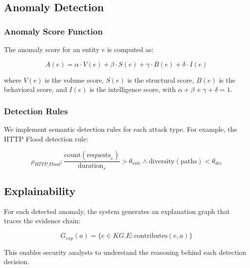 \documentclass[preprint,12pt]{elsarticle}
\begin{document}
\subsection{Anomaly Detection}

\subsubsection{Anomaly Score Function}

The anomaly score for an entity $e$ is computed as:

\begin{equation}
    A(e) = \alpha \cdot V(e) + \beta \cdot S(e) + \gamma \cdot B(e) + \delta \cdot I(e)
\end{equation}

where $V(e)$ is the volume score, $S(e)$ is the structural score, $B(e)$ is the behavioral score, and $I(e)$ is the intelligence score, with $\alpha + \beta + \gamma + \delta = 1$.

\subsubsection{Detection Rules}

We implement semantic detection rules for each attack type. For example, the HTTP Flood detection rule:

\begin{equation}
    \rho_{HTTP\_Flood}: \frac{\text{count}(\text{requests}_e)}{\text{duration}_s} > \theta_{rate} \land \text{diversity}(\text{paths}) < \theta_{div}
\end{equation}

\subsection{Explainability}

For each detected anomaly, the system generates an explanation graph that traces the evidence chain:

\begin{equation}
    G_{exp}(a) = \{e \in KG.E : \text{contributes}(e, a)\}
\end{equation}

This enables security analysts to understand the reasoning behind each detection decision.

\end{document}
